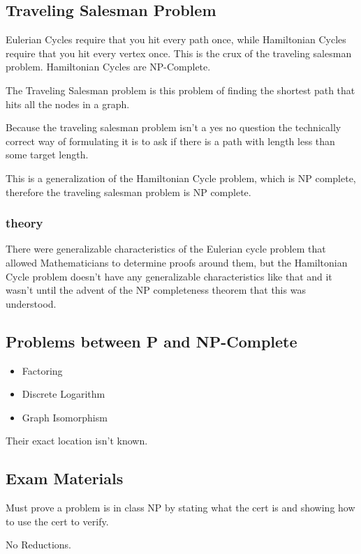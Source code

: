 \documentclass[english, 10pt]{article}
\begin{document}
\subsection{Traveling Salesman Problem}
Eulerian Cycles require that you hit every path once, while Hamiltonian Cycles
require that you hit every vertex once. This is the crux of the traveling
salesman problem. Hamiltonian Cycles are NP-Complete.

The Traveling Salesman problem is this problem of finding the shortest path that hits all the nodes in a graph.

Because the traveling salesman problem isn't a yes no question the technically
correct way of formulating it is to ask if there is a path with length less
than some target length.

This is a generalization of the Hamiltonian Cycle problem, which is NP
complete, therefore the traveling salesman problem is NP complete.

\subsubsection{theory}
There were generalizable characteristics of the Eulerian cycle problem that
allowed Mathematicians to determine proofs around them, but the Hamiltonian
Cycle problem doesn't have any generalizable characteristics like that and it
wasn't until the advent of the NP completeness theorem that this was
understood.

\subsection{Problems between P and NP-Complete}

\begin{itemize}
    \item Factoring
    \item Discrete Logarithm
    \item Graph Isomorphism
\end{itemize}

Their exact location isn't known.

\subsection{Exam Materials}

Must prove a problem is in class NP by stating what the cert is and showing how to use the cert to verify.

No Reductions.
\end{document}

